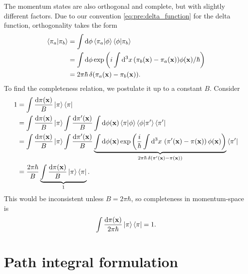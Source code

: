 The momentum states are also orthogonal and complete, but with slightly different factors.
Due to our convention \eqref{eq:pre:delta_function} for the delta function, orthogonality takes the form
\begin{equation}
\begin{split}
	\braket{\pi_a | \pi_b} &= \int \mathop{}\!\mathrm{d} \phi \braket{\pi_a | \phi} \braket{\phi | \pi_b} \\
	                       &= \int \mathop{}\!\mathrm{d} \phi \exp \left( i \int \mathop{}\!\mathrm{d}^3 x \, (\pi_b(\mathbf{x}) - \pi_a(\mathbf{x})) \phi(\mathbf{x}) / \hbar \right) \\
						   &= 2 \pi \hbar \, \delta(\pi_a(\mathbf{x}) - \pi_b(\mathbf{x})) .
\end{split}
\end{equation}
To find the completeness relation, we postulate it up to a constant $B$.
Consider
\begin{equation}
\begin{split}
	1 &= \int \frac{\dif \pi(\vec{x})}{B} \ket{\pi} \bra{\pi} \\
	  &= \int \frac{\dif \pi(\vec{x})}{B} \ket{\pi} \int \frac{\dif \pi'(\vec{x})}{B} \int \dif \phi(\vec{x}) \braket{\pi | \phi} \braket{\phi | \pi'} \bra{\pi'} \\
	  &= \int \frac{\dif \pi(\vec{x})}{B} \ket{\pi} \int \frac{\dif \pi'(\vec{x})}{B} \underbrace{\int \dif \phi(\vec{x}) \exp \left( \frac{i}{\hbar} \int \dif^3 x \, \left( \pi'(\vec{x}) - \pi(\vec{x}) \right) \phi(\vec{x}) \right)}_{2 \pi \hbar \, \delta(\pi'(\vec{x}) - \pi(\vec{x}))} \bra{\pi'} \\
	  &= \frac{2 \pi \hbar}{B} \underbrace{\int \frac{\dif \pi(\vec{x})}{B} \ket{\pi} \bra{\pi}}_{1} .
\end{split}
\end{equation}
This would be inconsistent unless $B = 2 \pi \hbar$, so completeness in momentum-space is
\begin{equation}
	\int \frac{\mathop{}\!\mathrm{d} \pi(\mathbf{x})}{2 \pi \hbar} \ket{\pi} \bra{\pi} = 1 .
\end{equation}

\section{Path integral formulation}

